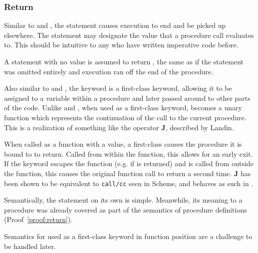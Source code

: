 \subsubsection{Return}

Similar to  and , the  statement causes execution
to end and be picked up elsewhere. The  statement may designate the value
that a procedure call evaluates to. This should be intuitive to any who have written
imperative code before.

A  statement with no value is assumed to return , the same as if
the  statement was omitted entirely and execution ran off the end of the
procedure.

Also similar to  and , the  keyword is a first-class
keyword, allowing it to be assigned to a variable within a procedure and later passed
around to other parts of the code. Unlike  and , when used as
a first-class keyword,  becomes a unary function which represents the continuation
of the call to the current procedure. This is a realization of something like the operator
\textbf{J}, described by Landin\cite{j}.

When called as a function with a value, a first-class  causes the procedure
it is bound to to return. Called from within the function, this allows for an early
exit. If the  keyword escapes the function (e.g. if  is
returned) and is called from outside the function, this causes the original function
call to return a second time. \textbf{J} has been shown to be equivalent to
\texttt{call/cc} seen in Scheme\cite{defint}, and behaves as such in \Trilogy{}.

\begin{bnf*}
\end{bnf*}

Semantically, the  statement on its own is simple. Meanwhile, its meaning
to a procedure was already covered as part of the semantics of procedure definitions
(Proof~\ref{proof:return}).

\begin{prooftree}
\end{prooftree}

Semantics for  used as a first-class keyword in function position are
a challenge to be handled later.
